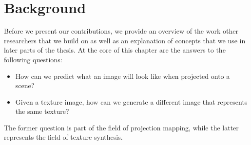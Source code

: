 \chapter{Background}
\label{chapter:background} 


Before we present our contributions, we provide an overview of the work other researchers that we build on as well as an explanation of concepts that we use in later parts of the thesis. At the core of this chapter are the answers to the following questions:

\begin{itemize}
    \item How can we predict what an image will look like when projected onto a scene?
    \item Given a texture image, how can we generate a different image that represents the same texture?
\end{itemize}

The former question is part of the field of projection mapping, while the latter represents the field of texture synthesis.




